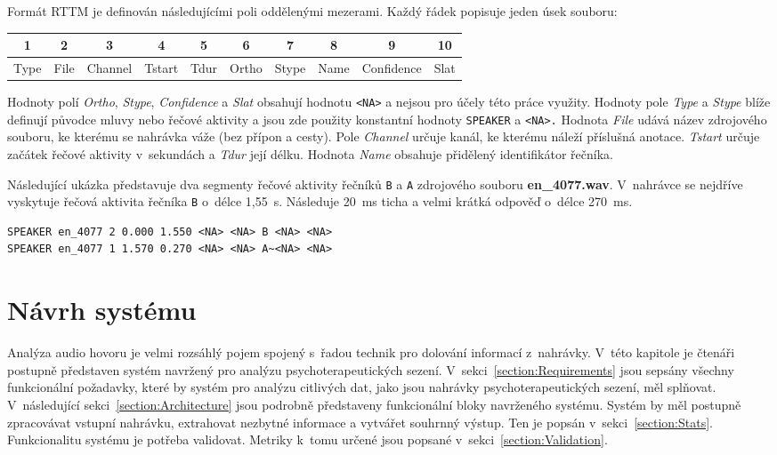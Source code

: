 Formát RTTM je definován následujícími poli oddělenými mezerami. Každý řádek popisuje jeden úsek souboru:

\begin{center}
\begin{tabular}{ |c|c|c|c|c|c|c|c|c|c| } 
\hline
1 & 2 & 3 & 4 & 5 & 6 & 7 & 8 & 9 & 10 \\
\hline
Type & File & Channel & Tstart & Tdur & Ortho & Stype & Name & Confidence & Slat \\
\hline
\end{tabular}
\end{center}

Hodnoty polí \textit{Ortho}, \textit{Stype}, \textit{Confidence} a \textit{Slat} obsahují hodnotu \texttt{<NA>} a nejsou pro účely této práce využity. Hodnoty pole \textit{Type} a \textit{Stype} blíže definují původce mluvy nebo řečové aktivity a jsou zde použity konstantní hodnoty \texttt{SPEAKER} a \texttt{<NA>.} Hodnota \textit{File} udává název zdrojového souboru, ke kterému se nahrávka váže (bez přípon a cesty). Pole \textit{Channel} určuje kanál, ke kterému náleží příslušná anotace. \textit{Tstart} určuje začátek řečové aktivity v~sekundách a \textit{Tdur} její délku. Hodnota \textit{Name} obsahuje přidělený identifikátor řečníka.

Následující ukázka představuje dva segmenty řečové aktivity řečníků \texttt{B} a \texttt{A} zdrojového souboru \textbf{en\_4077.wav}. V~nahrávce se nejdříve vyskytuje řečová aktivita řečníka \texttt{B} o~délce 1,55~s. Následuje 20~ms ticha a velmi krátká odpověď o~délce 270~ms. 
\begin{lstlisting}
SPEAKER en_4077 2 0.000 1.550 <NA> <NA> B <NA> <NA>
SPEAKER en_4077 1 1.570 0.270 <NA> <NA> A~<NA> <NA>
\end{lstlisting}



\chapter{Návrh systému}
\label{chap:System_design}
Analýza audio hovoru je velmi rozsáhlý pojem spojený s~řadou technik pro dolování informací z~nahrávky. V~této kapitole je čtenáři postupně představen systém navržený pro analýzu psychoterapeutických sezení. V~sekci~\ref{section:Requirements} jsou sepsány všechny funkcionální požadavky, které by systém pro analýzu citlivých dat, jako jsou nahrávky psychoterapeutických sezení, měl splňovat. V~následující sekci~\ref{section:Architecture} jsou podrobně představeny funkcionální bloky navrženého systému. Systém by měl postupně zpracovávat vstupní nahrávku, extrahovat nezbytné informace a vytvářet souhrnný výstup. Ten je popsán v~sekci~\ref{section:Stats}. Funkcionalitu systému je potřeba validovat. Metriky k~tomu určené jsou popsané v~sekci~\ref{section:Validation}.

